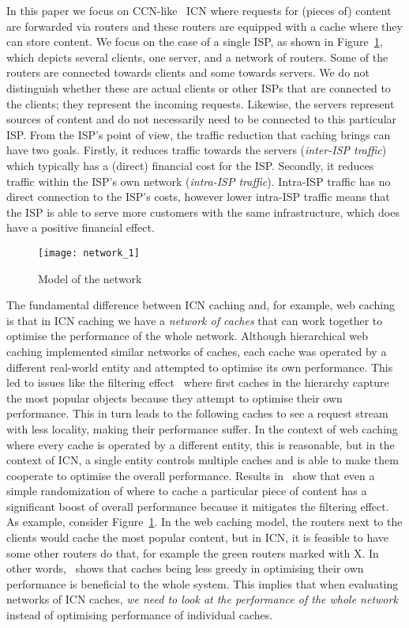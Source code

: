 \documentclass{sigcomm-alternate}
\begin{document}
In this paper we focus on CCN-like~\cite{jacobson:ccn} ICN where requests for (pieces of) content are forwarded via routers and these routers are equipped with a cache where they can store content.
We focus on the case of a single ISP, as shown in Figure~\ref{fig:network-model}, which depicts several clients, one server, and a network of routers.
Some of the routers are connected towards clients and some towards servers.
We do not distinguish whether these are actual clients or other ISPs that are connected to the clients; they represent the incoming requests.
Likewise, the servers represent sources of content and do not necessarily need to be connected to this particular ISP.
From the ISP's point of view, the traffic reduction that caching brings can have two goals.
Firstly, it reduces traffic towards the servers (\emph{inter-ISP traffic}) which typically has a (direct) financial cost for the ISP.
Secondly, it reduces traffic within the ISP's own network (\emph{intra-ISP traffic}).
Intra-ISP traffic has no direct connection to the ISP's costs, however lower intra-ISP traffic means that the ISP is able to serve more customers with the same infrastructure, which does have a positive financial effect.

\begin{figure}[!tb]
  \centering
  \texttt{[image: network\_1]}
  \caption{Model of the network}
  \label{fig:network-model}
\end{figure}

The fundamental difference between ICN caching and, for example, web caching is that in ICN caching we have a \emph{network of caches} that can work together to optimise the performance of the whole network.
Although hierarchical web caching implemented similar networks of caches, each cache was operated by a different real-world entity and attempted to optimise its own performance.
This led to issues like the filtering effect~\cite{Wolman:1999:SPC:319151.319153,Williamson:2002:FEW} where first caches in the hierarchy capture the most popular objects because they attempt to optimise their own performance.
This in turn leads to the following caches to see a request stream with less locality, making their performance suffer.
In the context of web caching where every cache is operated by a different entity, this is reasonable, but in the context of ICN, a single entity controls multiple caches and is able to make them cooperate to optimise the overall performance.
Results in~\cite{wong:globecom2012} show that even a simple randomization of where to cache a particular piece of content has a significant boost of overall performance because it mitigates the filtering effect.
As example, consider Figure~\ref{fig:network-model}.
In the web caching model, the routers next to the clients would cache the most popular content, but in ICN, it is feasible to have some other routers do that, for example the green routers marked with X.
In other words,~\cite{wong:globecom2012} shows that caches being less greedy in optimising their own performance is beneficial to the whole system.
This implies that when evaluating networks of ICN caches, \emph{we need to look at the performance of the whole network} instead of optimising performance of individual caches.
\end{document}
